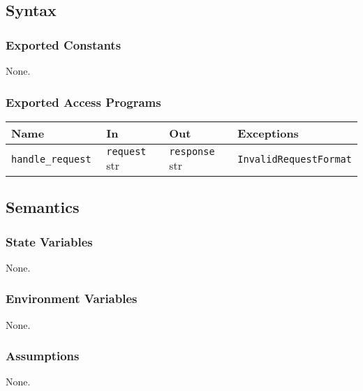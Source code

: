 \documentclass[12pt, titlepage]{article}
\begin{document}
\subsection{Syntax}

\subsubsection{Exported Constants}
None.

\subsubsection{Exported Access Programs}

\begin{center}
\begin{tabular}{p{3cm} p{4cm} p{4cm} p{4cm}}
\hline
\textbf{Name} & \textbf{In} & \textbf{Out} & \textbf{Exceptions} \\
\hline
\texttt{handle\_request }& \texttt{request} str & \texttt{response} str & \texttt{InvalidRequestFormat} \\
\hline
\end{tabular}
\end{center}

\subsection{Semantics}

\subsubsection{State Variables}
None.

\subsubsection{Environment Variables}
None.

\subsubsection{Assumptions}
None.
\end{document}

